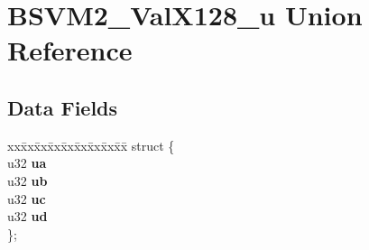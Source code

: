 \hypertarget{unionBSVM2__ValX128__u}{\section{B\-S\-V\-M2\-\_\-\-Val\-X128\-\_\-u Union Reference}
\label{unionBSVM2__ValX128__u}
}
\subsection*{Data Fields}
\begin{DoxyCompactItemize}
\item 
\hypertarget{unionBSVM2__ValX128__u_a1174cef24a9664cea086c9558eaa95f9}{\begin{tabbing}
xx\=xx\=xx\=xx\=xx\=xx\=xx\=xx\=xx\=\kill
struct \{\\
\hypertarget{structBSVM2__ValX128__u_1_1@6_a2f67ba264d8c9a5c0315ffbcbc24744b}{\>s32 {\bfseries ia}\\
\hypertarget{structBSVM2__ValX128__u_1_1@6_afdd6b6c7f6b11e7640a62fb0dd0feb78}{\>s32 {\bfseries ib}\\
\hypertarget{structBSVM2__ValX128__u_1_1@6_ad9926693565a1079fd3348c4cc038bec}{\>s32 {\bfseries ic}\\
\hypertarget{structBSVM2__ValX128__u_1_1@6_aba23d32ecf94126a1ffc6d05906e1238}{\>s32 {\bfseries id}\\
\}; }\label{unionBSVM2__ValX128__u_a1174cef24a9664cea086c9558eaa95f9}
\\

\end{tabbing}\item 
\hypertarget{unionBSVM2__ValX128__u_abf6f0000cbf4646e61bf359c06dec92b}{\begin{tabbing}
xx\=xx\=xx\=xx\=xx\=xx\=xx\=xx\=xx\=\kill
struct \{\\
\hypertarget{structBSVM2__ValX128__u_1_1@8_aa2eee5bba4e0ba1d604b71e363e94c34}{\>u32 {\bfseries ua}\\
\hypertarget{structBSVM2__ValX128__u_1_1@8_a91a7f006a2c3982a0ee617c6d0767586}{\>u32 {\bfseries ub}\\
\hypertarget{structBSVM2__ValX128__u_1_1@8_aa7015c7d5215018158af1837da12606d}{\>u32 {\bfseries uc}\\
\hypertarget{structBSVM2__ValX128__u_1_1@8_a6f41276557c606e96e32f349a7dee3c9}{\>u32 {\bfseries ud}\\
\}; }\label{unionBSVM2__ValX128__u_abf6f0000cbf4646e61bf359c06dec92b}
\\

}}}
\end{tabbing}}}
\end{DoxyCompactItemize}
